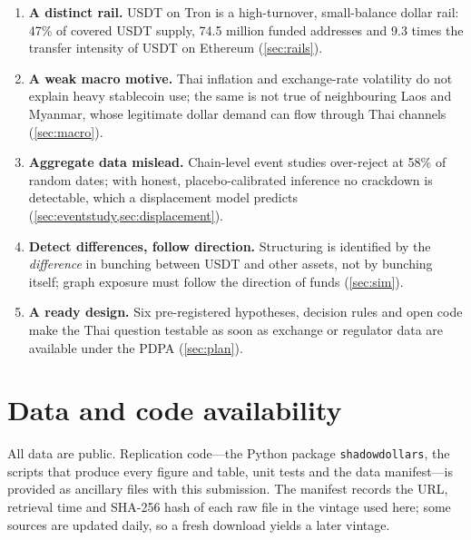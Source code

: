 \documentclass{article}
\theoremstyle{plain}
\theoremstyle{definition}
\theoremstyle{remark}
\newcommand{\1}{\mathbf{1}}
\begin{document}
\vspace{1.2em}
\begin{tcolorbox}[findings,title={Key findings},fontupper=\small]
\begin{enumerate}[leftmargin=1.4em,label=\textbf{\arabic*.},itemsep=0.05em,topsep=0.1em]
\item \textbf{A distinct rail.} USDT on Tron is a high-turnover, small-balance dollar rail: 47\% of covered USDT supply,
74.5 million funded addresses and 9.3 times the transfer intensity of USDT on Ethereum (\cref{sec:rails}).
\item \textbf{A weak macro motive.} Thai inflation and exchange-rate volatility do not explain heavy stablecoin use; the
same is not true of neighbouring Laos and Myanmar, whose legitimate dollar demand can flow through Thai channels (\cref{sec:macro}).
\item \textbf{Aggregate data mislead.} Chain-level event studies over-reject at 58\% of random dates; with honest,
placebo-calibrated inference no crackdown is detectable, which a displacement model predicts (\cref{sec:eventstudy,sec:displacement}).
\item \textbf{Detect differences, follow direction.} Structuring is identified by the \emph{difference} in bunching
between USDT and other assets, not by bunching itself; graph exposure must follow the direction of funds (\cref{sec:sim}).
\item \textbf{A ready design.} Six pre-registered hypotheses, decision rules and open code make the Thai question
testable as soon as exchange or regulator data are available under the PDPA (\cref{sec:plan}).
\end{enumerate}
\end{tcolorbox}

\newpage









\section*{Data and code availability}
All data are public. Replication code---the Python package \texttt{shadowdollars}, the scripts that produce every
figure and table, unit tests and the data manifest---is provided as ancillary files with this submission. The manifest
records the URL, retrieval time and SHA-256 hash of each raw file in the vintage used here; some sources are updated
daily, so a fresh download yields a later vintage.
\end{document}
